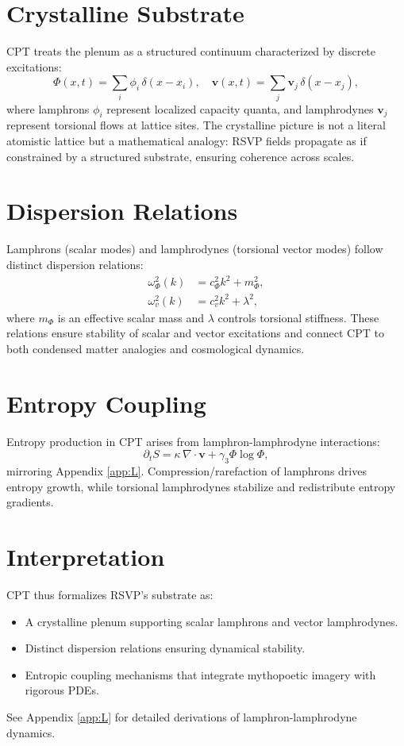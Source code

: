 \documentclass[12pt]{report}
\begin{document}
\section{Crystalline Substrate}
CPT treats the plenum as a structured continuum characterized by discrete excitations:
\begin{equation}
\Phi(x,t) = \sum_{i} \phi_i \, \delta(x-x_i), \quad \mathbf{v}(x,t) = \sum_{j} \mathbf{v}_j \, \delta(x-x_j),
\end{equation}
where lamphrons \(\phi_i\) represent localized capacity quanta, and lamphrodynes \(\mathbf{v}_j\) represent torsional flows at lattice sites. The crystalline picture is not a literal atomistic lattice but a mathematical analogy: RSVP fields propagate as if constrained by a structured substrate, ensuring coherence across scales.

\section{Dispersion Relations}
Lamphrons (scalar modes) and lamphrodynes (torsional vector modes) follow distinct dispersion relations:
\begin{align}
\omega_\Phi^2(k) &= c_\Phi^2 k^2 + m_\Phi^2, \\
\omega_v^2(k) &= c_v^2 k^2 + \lambda^2,
\end{align}
where \(m_\Phi\) is an effective scalar mass and \(\lambda\) controls torsional stiffness. These relations ensure stability of scalar and vector excitations and connect CPT to both condensed matter analogies and cosmological dynamics.

\section{Entropy Coupling}
Entropy production in CPT arises from lamphron-lamphrodyne interactions:
\begin{equation}
\partial_t S = \kappa \, \nabla \cdot \mathbf{v} + \gamma_3 \Phi \log \Phi,
\end{equation}
mirroring Appendix \ref{app:L}. Compression/rarefaction of lamphrons drives entropy growth, while torsional lamphrodynes stabilize and redistribute entropy gradients.

\section{Interpretation}
CPT thus formalizes RSVP’s substrate as:
\begin{itemize}
    \item A crystalline plenum supporting scalar lamphrons and vector lamphrodynes.
    \item Distinct dispersion relations ensuring dynamical stability.
    \item Entropic coupling mechanisms that integrate mythopoetic imagery with rigorous PDEs.
\end{itemize}
See Appendix \ref{app:L} for detailed derivations of lamphron-lamphrodyne dynamics.
\end{document}
